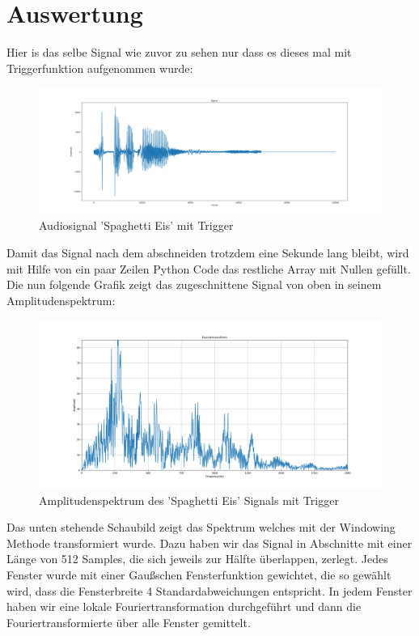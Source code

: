 \documentclass[12pt, oneside, a4paper, \docLanguage]{report}
\begin{document}
\section{Auswertung}
\label{chap:VERSUCH_1_AUSWERTUNG}
Hier is das selbe Signal wie zuvor zu sehen nur dass es dieses mal mit Triggerfunktion aufgenommen wurde:
\begin{figure}[H]
	\includegraphics[width=1\textwidth]{../Images/SpaghettiEisCuted.png}
	\caption{Audiosignal 'Spaghetti Eis' mit Trigger}
\end{figure}
Damit das Signal nach dem abschneiden trotzdem eine Sekunde lang bleibt, 
wird mit Hilfe von ein paar Zeilen Python Code
das restliche Array mit Nullen gefüllt.
\newline
\newline
Die nun folgende Grafik zeigt das zugeschnittene Signal von oben in seinem Amplitudenspektrum:
\begin{figure}[H]
	\includegraphics[width=1\textwidth]{../Images/SpaghettiEisFFT.png}
	\caption{Amplitudenspektrum des 'Spaghetti Eis' Signals mit Trigger}
\end{figure}
Das unten stehende Schaubild zeigt das Spektrum welches mit der Windowing Methode transformiert wurde.\newline
Dazu haben wir das Signal in Abschnitte mit einer Länge von 512 Samples, die sich jeweils zur
Hälfte überlappen, zerlegt. Jedes Fenster wurde mit einer Gaußschen
Fensterfunktion gewichtet, die so gewählt wird, dass die Fensterbreite 4 Standardabweichungen
entspricht. In jedem Fenster haben wir eine lokale Fouriertransformation durchgeführt und
dann die Fouriertransformierte über alle Fenster gemittelt.
\end{document}
